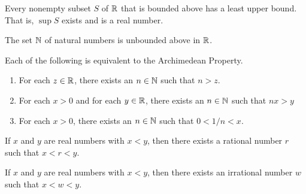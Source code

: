 \documentclass[12pt]{article}
\begin{document}
\begin{definition}
  Every nonempty subset $S$ of $\mathbb{R}$ that is bounded above has a least upper
  bound. That is, $\sup S$ exists and is a real number.
\end{definition}

\begin{theorem}
  The set $\mathbb{N}$ of natural numbers is unbounded above in $\mathbb{R}$.
\end{theorem}

\begin{theorem}
  Each of the following is equivalent to the Archimedean Property.
  \begin{enumerate}
    \item For each $z \in \mathbb{R}$, there exists an $n \in \mathbb{N}$ such that $n >
      z$.
    \item For each $x > 0$ and for each $y \in \mathbb{R}$, there exists an $n \in
      \mathbb{N}$ such that $nx > y$
    \item For each $x > 0$, there exists an $n \in \mathbb{N}$ such that $0 < 1/n <
    x$.
  \end{enumerate}
\end{theorem}

\begin{theorem}
  If $x$ and $y$ are real numbers with $x < y$, then there exists a rational
  number $r$ such that $x < r < y$.
\end{theorem}

\begin{theorem}
  If $x$ and $y$ are real numbers with $x < y$, then there exists an
  irrational number $w$ such that $x < w < y$.
\end{theorem}
\end{document}
